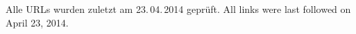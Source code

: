 \documentclass[
               paper=a4,
               BCOR1.92mm,DIV12,headinclude, %
               titlepage,
               bibliography=totoc,
               headsepline,
               cleardoublepage=empty,
               parskip=half,
	       pointlessnumbers, %
               final   %
               ]{scrreprt}
\let\ifdeutsch\iffalse
\begin{document}
\renewcommand*{\chapterpagestyle}{scrplain}
\pagestyle{scrheadings}

%
%
%







%
%
%
%
\appendix
%
%
\ifdeutsch
\else
\fi

\ifdeutsch
Alle URLs wurden zuletzt am 23.\,04.\,2014 geprüft.
\else
All links were last followed on April 23, 2014.
\fi

\pagestyle{empty}
\renewcommand*{\chapterpagestyle}{empty}
\Versicherung
\end{document}

